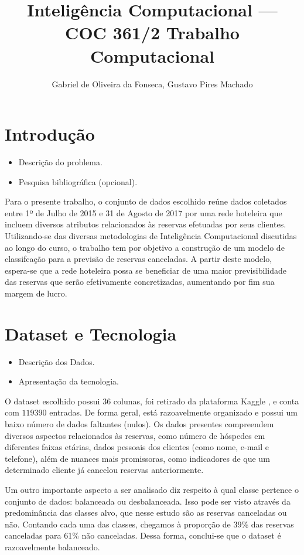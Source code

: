 \documentclass{homework}
\title{Inteligência Computacional --- COC 361\linebreak2021/2 \linebreak\linebreak Trabalho Computacional}
\author{Gabriel de Oliveira da Fonseca, Gustavo Pires Machado}
\begin{document}
\maketitle

\section{Introdução}

\begin{itemize}
\color{red}
    \item Descrição do problema.
    \item Pesquisa bibliográfica (opcional).
\end{itemize}

Para o presente trabalho, o conjunto de dados escolhido reúne dados coletados entre 1º de Julho de 2015 e 31 de Agosto
de 2017 por uma rede hoteleira que incluem diversos atributos relacionados às reservas efetuadas por seus clientes.
Utilizando-se das diversas metodologias de Inteligência Computacional discutidas ao longo do curso, o trabalho tem por
objetivo a construção de um modelo de classifcação para a previsão de reservas canceladas. A partir deste modelo,
espera-se que a rede hoteleira possa se beneficiar de uma maior previsibilidade das reservas que serão efetivamente
concretizadas, aumentando por fim sua margem de lucro.

\section{Dataset e Tecnologia}

\begin{itemize}
\color{red}
    \item Descrição dos Dados.
    \item Apresentação da tecnologia.
\end{itemize}

O dataset escolhido possui 36 colunas, foi retirado da plataforma Kaggle \cite{kaggle}, e conta com $119390$ entradas. 
De forma geral, está razoavelmente organizado e possui um baixo número de dados faltantes (nulos). Os dados presentes
compreendem diversos aspectos relacionados às reservas, como número de hóspedes em diferentes faixas etárias, dados
pessoais dos clientes (como nome, e-mail e telefone), além de nuances mais promissoras, como indicadores de que um
determinado cliente já cancelou reservas anteriormente.

Um outro importante aspecto a ser analisado diz respeito à qual classe pertence o conjunto de dados: balanceada ou
desbalanceada. Isso pode ser visto através da predominância das classes alvo, que nesse estudo são as reservas
canceladas ou não. Contando cada uma das classes, chegamos à proporção de 39\% das reservas canceladas para 61\% não
canceladas. Dessa forma, conclui-se que o dataset é razoavelmente balanceado.
\end{document}
